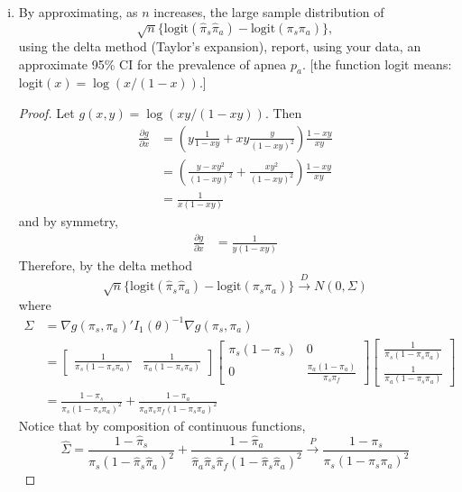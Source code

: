 \documentclass[letterpaper, 12pt]{article}
\begin{document}
\begin{enumerate}[(i)]
\begin{proof}
By the invariance property of the MLE, the MLE for $p_a$ is
\[
\hat{p_a} = \hat{\pi_s} \hat{\pi_a} = (N_s N_a)/(n N_f).
\] 
\end{proof}
\item
By approximating, as $n$ increases, the large sample distribution of
\[
\sqrt{n} \{
\text{logit}(\hat{\pi}_s\hat{\pi}_a)
-
\text{logit}(\pi_s\pi_a)
\},
\]
using the delta method (Taylor's expansion), report, using your data, an approximate 95\% CI for the prevalence of apnea $p_a$. [the function logit means: logit$(x) = \log(x/(1-x))$.]
\begin{proof}
Let $g(x,y) = \log(xy/(1-xy))$. Then
\begin{align*}
\frac{\partial g}{\partial x} 
&= 
\left(y \frac{1}{1-xy} + xy \frac{y}{(1-xy)^2}\right)
\frac{1-xy}{xy}\\
&= 
\left(
\frac{y - xy^2}{(1-xy)^2} + \frac{xy^2}{(1-xy)^2}
\right)
\frac{1-xy}{xy}
\\
&=
\frac{1}{x(1-xy)}
\end{align*}
and by symmetry,
\begin{align*}
\frac{\partial g}{\partial x} 
&=
\frac{1}{y(1-xy)}
\end{align*}
Therefore, by the delta method
\[
\sqrt{n} \{
\text{logit}(\hat{\pi}_s\hat{\pi}_a)
-
\text{logit}(\pi_s\pi_a)
\}
\xrightarrow{D}
N(0, \Sigma)
\]
where
\begin{align*}
\Sigma
&=
\nabla g(\pi_s, \pi_a)' I_1(\theta)^{-1} \nabla g(\pi_s, \pi_a)
\\
&=
\begin{bmatrix}
\frac{1}{\pi_s(1-\pi_s\pi_a)}
&
\frac{1}{\pi_a(1-\pi_s\pi_a)}
\end{bmatrix}
\begin{bmatrix}
{\pi_s(1-\pi_s)}
&
0
\\
0
&
\frac{\pi_a(1-\pi_a)}{ \pi_s\pi_f}
\end{bmatrix}
\begin{bmatrix}
\frac{1}{\pi_s(1-\pi_s\pi_a)}
\\
\frac{1}{\pi_a(1-\pi_s\pi_a)}
\end{bmatrix}
\\
&=
\frac{1 - \pi_s}{\pi_s(1-\pi_s\pi_a)^2}
+
\frac{1 - \pi_a}{\pi_a\pi_s\pi_f(1-\pi_s\pi_a)^2}
\end{align*}
Notice that by composition of continuous functions,
\[
\hat{\Sigma} = 
\frac{1 - \hat{\pi}_s}{\hat{\pi}_s(1-\hat{\pi}_s\hat{\pi}_a)^2}
+
\frac{1 - \hat{\pi}_a}{\hat{\pi}_a\hat{\pi}_s\hat{\pi}_f(1-\hat{\pi}_s\hat{\pi}_a)^2}
\xrightarrow{P}
\frac{1 - \pi_s}{\pi_s(1-\pi_s\pi_a)^2}
\]
\end{proof}
\end{enumerate}
\end{document}
